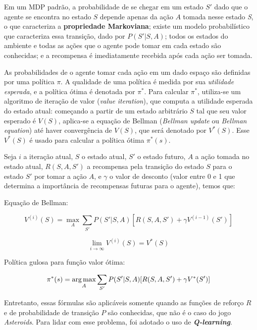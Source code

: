 Em um MDP padrão, a probabilidade de se chegar em um estado $S'$ dado que o agente se encontra no estado $S$ depende apenas da ação $A$ tomada nesse estado \textit{S}, o que caracteriza a \textbf{propriedade Markoviana}; existe um modelo probabilístico que caracteriza essa transição, dado por $P(S'|S,A)$; todos os estados do ambiente e todas as ações que o agente pode tomar em cada estado são conhecidas; e a recompensa é imediatamente recebida após cada ação ser tomada.

As probabilidades de o agente tomar cada ação em um dado espaço são definidas por uma política $\pi$. A qualidade de uma política é medida por sua \textit{utilidade esperada}, e a política ótima é denotada por $\pi^{*}$. Para calcular $\pi^{*}$, utiliza-se um algoritmo de iteração de valor (\textit{value iteration}), que computa a utilidade esperada do estado atual: começando a partir de um estado arbitrário $S$ tal que seu valor esperado é $V(S)$, aplica-se a equação de Bellman (\textit{Bellman update} ou \textit{Bellman equation}) até haver convergência de $V(S)$, que será denotado por $V^{*}(S)$. Esse $V^{*}(S)$ é usado para calcular a política ótima $\pi^{*}(s)$.

Seja $i$ a iteração atual, $S$ o estado atual, $S'$ o estado futuro, $A$ a ação tomada no estado atual, $R(S,A,S')$ a recompensa pela transição do estado $S$ para o estado $S'$ por tomar a ação $A$, e $\gamma$ o valor de desconto (valor entre 0 e 1 que determina a importância de recompensas futuras para o agente), temos que:

Equação de Bellman:

\begin{equation} \label{eq:bellman}
V^{(i)}(S) = \max_{A}\sum_{S'}P(S'|S,A)[R(S,A,S') + \gamma V^{(i-1)}(S')]
\end{equation}

\begin{equation} \label{eq:qvalue}
\lim_{i\to\infty} V^{(i)}(S) = V^{*}(S)
\end{equation}

Política gulosa para função valor ótima:

\begin{equation} \label{eq:opt_pol}
\pi^{*}(s) = \operatorname*{arg\,max}_{A}\sum_{S'}P(S'|S,A)[R(S,A,S') + \gamma V^{*}(S')]
\end{equation}

Entretanto, essas fórmulas são aplicáveis somente quando as funções de reforço $R$ e de probabilidade de transição $P$ são conhecidas, que não é o caso do jogo \textit{Asteroids}. Para lidar com esse problema, foi adotado o uso de \textit{\textbf{Q-learning}}.

